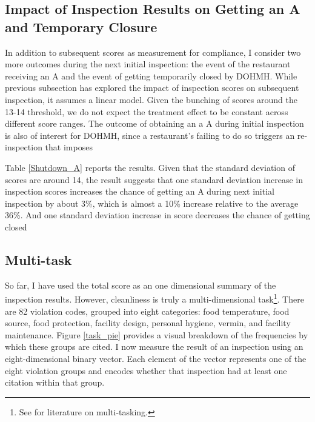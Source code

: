 \documentclass[11pt]{article}
\begin{document}
\subsection{Impact of Inspection Results on Getting an A and Temporary Closure}

In addition to subsequent scores as measurement for compliance, I consider two more outcomes during the next initial inspection: the event of the restaurant receiving an A and the event of getting temporarily closed by DOHMH. 
While previous subsection has explored the impact of inspection scores on subsequent inspection, it assumes a linear model. Given the bunching of scores around the 13-14 threshold, we do not expect the treatment effect to be constant across different score ranges. The outcome of obtaining an a A during initial inspection is also of interest for DOHMH, since a restaurant's failing to do so triggers an re-inspection that imposes 
 
Table \ref{Shutdown_A} reports the results. Given that the standard deviation of scores are around 14, the result suggests that one standard deviation increase in inspection scores increases the chance of getting an A during next initial inspection by about 3\%, which is almost a 10\% increase relative to the average 36\%. And one standard deviation increase in score decreases the chance of getting closed 

\subsection{Multi-task}

So far, I have used the total score as an one dimensional summary of the inspection results. However, cleanliness is truly a multi-dimensional task\footnote{See \cite{Lu_2012} for literature on multi-tasking.}. There are 82 violation codes, grouped into eight categories: food temperature, food source, food protection, facility design, personal hygiene, vermin, and facility maintenance. Figure \ref{task_pie} provides a visual breakdown of the frequencies by which these groups are cited. I now measure the result of an inspection using an eight-dimensional binary vector. Each element of the vector represents one of the eight violation groups and encodes whether that inspection had at least one citation within that group. 
\end{document}
